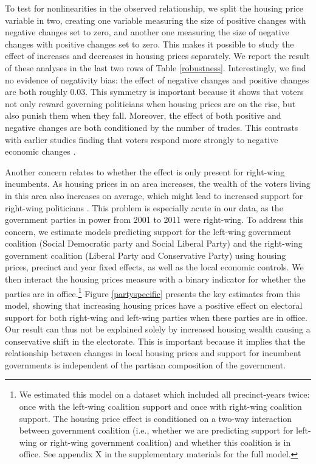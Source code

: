 \documentclass[12pt,a4paper]{article}
\begin{document}
	To test for nonlinearities in the observed relationship, we split the housing price variable in two, creating one variable measuring the size of positive changes with negative changes set to zero, and another one measuring the size of negative changes with positive changes set to zero. This makes it possible to study the effect of increases and decreases in housing prices separately. We report the result of these analyses in the last two rows of Table \ref{robustness}. Interestingly, we find no evidence of negativity bias: the effect of negative changes and positive changes are both roughly 0.03. This symmetry is important because it shows that voters not only reward governing politicians when housing prices are on the rise, but also punish them when they fall. Moreover, the effect of both positive and negative changes are both conditioned by the number of trades.  This contrasts with earlier studies finding that voters respond more strongly to negative economic changes \citep[e.g.][]{bloom1975voter,headrick1991attention,soroka2014negativity}. 
	
	
	Another concern relates to whether the effect is only present for right-wing incumbents. As housing prices in an area increases, the wealth of the voters living in this area also increases on average, which might lead to increased support for right-wing politicians \cite{ansell2014political}. This problem is especially acute in our data, as the government parties in power from 2001 to 2011 were right-wing. To address this concern, we estimate models predicting support for the left-wing government coalition (Social Democratic party and Social Liberal Party) and the right-wing government coalition (Liberal Party and Conservative Party) using housing prices, precinct and year fixed effects, as well as the local economic controls. We then interact the housing prices measure with a binary indicator for whether the parties are in office.\footnote{We estimated this model on a dataset which included all precinct-years twice: once with the left-wing coalition support and once with right-wing coalition support. The housing price effect is conditioned on a two-way interaction between government coalition (i.e., whether we are predicting support for left-wing or right-wing government coalition) and whether this coalition is in office. See appendix X in the supplementary materials for the full model.} Figure \ref{partyspecific} presents the key estimates from this model, showing that increasing housing prices have a positive effect on electoral support for both right-wing and left-wing parties when these parties are in office. Our result can thus not be explained solely by increased housing wealth causing a conservative shift in the electorate. This is important because it implies that the relationship between changes in local housing prices and support for incumbent governments is independent of the partisan composition of the government.
	
\end{document}
